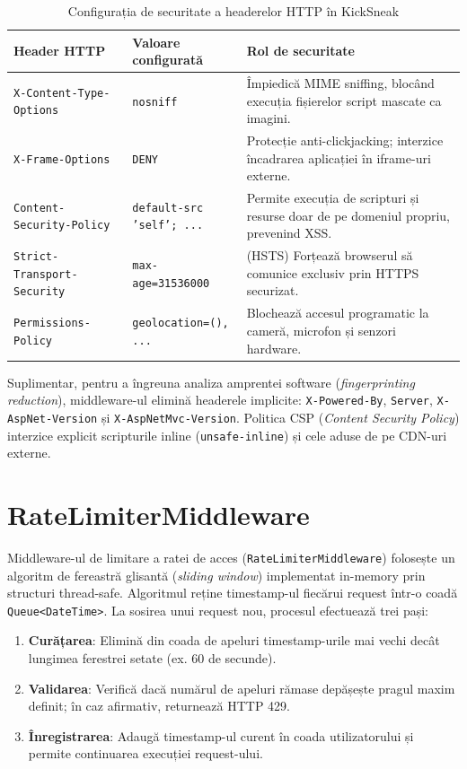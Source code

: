 \begin{table}[htbp]
\centering
\small
\begin{tabular}{p{5cm} p{4cm} p{6cm}}
\toprule
\textbf{Header HTTP} & \textbf{Valoare configurată} & \textbf{Rol de securitate} \\
\midrule
\texttt{X-Content-Type-Options} & \texttt{nosniff} & Împiedică MIME sniffing, blocând execuția fișierelor script mascate ca imagini. \\
\texttt{X-Frame-Options} & \texttt{DENY} & Protecție anti-clickjacking; interzice încadrarea aplicației în iframe-uri externe. \\
\texttt{Content-Security-Policy} & \texttt{default-src 'self'; ...} & Permite execuția de scripturi și resurse doar de pe domeniul propriu, prevenind XSS. \\
\texttt{Strict-Transport-Security} & \texttt{max-age=31536000} & (HSTS) Forțează browserul să comunice exclusiv prin HTTPS securizat. \\
\texttt{Permissions-Policy} & \texttt{geolocation=(), ...} & Blochează accesul programatic la cameră, microfon și senzori hardware. \\
\bottomrule
\end{tabular}
\caption{Configurația de securitate a headerelor HTTP în KickSneak}
\label{tab:secheaders}
\end{table}

Suplimentar, pentru a îngreuna analiza amprentei software (\textit{fingerprinting reduction}), middleware-ul elimină headerele implicite: \texttt{X-Powered-By}, \texttt{Server}, \texttt{X-AspNet-Version} și \texttt{X-AspNetMvc-Version}. Politica CSP (\textit{Content Security Policy}) interzice explicit scripturile inline (\texttt{unsafe-inline}) și cele aduse de pe CDN-uri externe.

\section{RateLimiterMiddleware}

Middleware-ul de limitare a ratei de acces (\texttt{RateLimiterMiddleware}) folosește un algoritm de fereastră glisantă (\textit{sliding window}) implementat in-memory prin structuri thread-safe. Algoritmul reține timestamp-ul fiecărui request într-o coadă \texttt{Queue<DateTime>}. La sosirea unui request nou, procesul efectuează trei pași:
\begin{enumerate}
    \item \textbf{Curățarea}: Elimină din coada de apeluri timestamp-urile mai vechi decât lungimea ferestrei setate (ex. 60 de secunde).
    \item \textbf{Validarea}: Verifică dacă numărul de apeluri rămase depășește pragul maxim definit; în caz afirmativ, returnează HTTP 429.
    \item \textbf{Înregistrarea}: Adaugă timestamp-ul curent în coada utilizatorului și permite continuarea execuției request-ului.
\end{enumerate}

